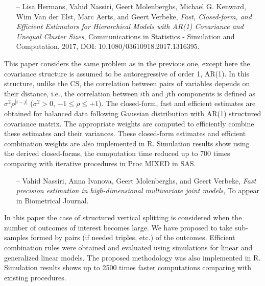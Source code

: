 \documentclass[14pt]{article}
\begin{document}
\begin{itemize}
\item[--]{\textsf{Lisa Hermans, Vahid Nassiri, Geert Molenberghs, Michael G. Kenward, Wim Van der Elst, Marc Aerts, and Geert Verbeke}}, {\it Fast, Closed-form, and Efficient Estimators for Hierarchical Models with AR(1) Covariance and Unequal Cluster Sizes}, Communications in Statistics - Simulation and Computation, 2017, DOI: 10.1080/03610918.2017.1316395.
\end{itemize}
This paper considers the same problem as in the previous one, except here the covariance structure is assumed to be autoregressive of order 1, AR(1). In this structure, unlike the CS, the correlation between pairs of variables depends on their distance, i.e., the correlation between $i$th and $j$th components is defined as $\sigma^2 \rho^{|i-j|}$ ($\sigma^2>0$, $-1\leq\rho\leq +1$). The closed-form, fast and efficient estimates are obtained for balanced data following Gaussian distribution with AR(1) structured covariance matrix. The appropriate weights are computed to efficiently combine these estimates and their variances. These closed-form estimates and efficient combination weights are also implemented in \textsf{R}. Simulation results show using the derived closed-forms, the computation time reduced up to 700 times comparing with iterative procedures in \textsf{Proc MIXED} in \textsf{SAS}.



\begin{itemize}
\item[--]{\textsf{Vahid Nassiri, Anna Ivanova, Geert Molenberghs, and Geert Verbeke}}, {\it Fast precision estimation in high-dimensional multivariate joint models}, To appear in Biometrical Journal.
\end{itemize}
In this paper the case of structured vertical splitting is considered when the number of outcomes of interest becomes large. We have proposed to take sub-samples formed by pairs (if needed triples, etc.) of the outcomes. Efficient combination rules were obtained and evaluated using simulations for linear and generalized linear models. The proposed methodology was also implemented in \textsf{R}. Simulation results shows up to 2500 times faster computations comparing with existing procedures.
\end{document}
